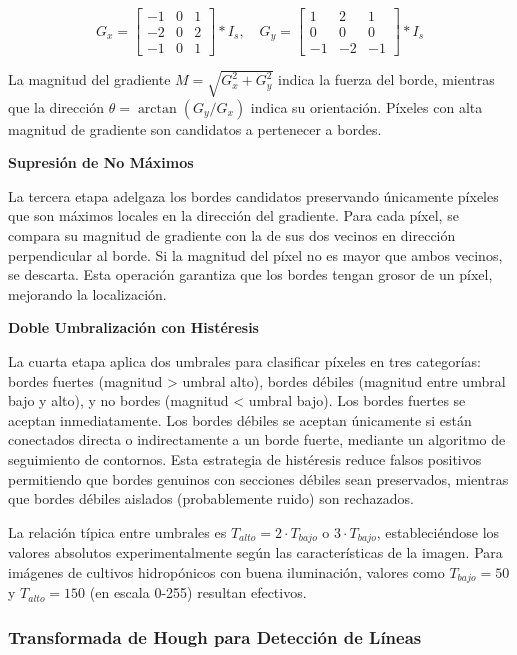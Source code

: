 \begin{equation}
G_x = \begin{bmatrix} -1 & 0 & 1 \\ -2 & 0 & 2 \\ -1 & 0 & 1 \end{bmatrix} \ast I_s, \quad G_y = \begin{bmatrix} 1 & 2 & 1 \\ 0 & 0 & 0 \\ -1 & -2 & -1 \end{bmatrix} \ast I_s
\end{equation}

La magnitud del gradiente $M = \sqrt{G_x^2 + G_y^2}$ indica la fuerza del borde, mientras que la dirección $\theta = \arctan(G_y/G_x)$ indica su orientación. Píxeles con alta magnitud de gradiente son candidatos a pertenecer a bordes.

\textbf{Supresión de No Máximos}

La tercera etapa adelgaza los bordes candidatos preservando únicamente píxeles que son máximos locales en la dirección del gradiente. Para cada píxel, se compara su magnitud de gradiente con la de sus dos vecinos en dirección perpendicular al borde. Si la magnitud del píxel no es mayor que ambos vecinos, se descarta. Esta operación garantiza que los bordes tengan grosor de un píxel, mejorando la localización.

\textbf{Doble Umbralización con Histéresis}

La cuarta etapa aplica dos umbrales para clasificar píxeles en tres categorías: bordes fuertes (magnitud > umbral alto), bordes débiles (magnitud entre umbral bajo y alto), y no bordes (magnitud < umbral bajo). Los bordes fuertes se aceptan inmediatamente. Los bordes débiles se aceptan únicamente si están conectados directa o indirectamente a un borde fuerte, mediante un algoritmo de seguimiento de contornos. Esta estrategia de histéresis reduce falsos positivos permitiendo que bordes genuinos con secciones débiles sean preservados, mientras que bordes débiles aislados (probablemente ruido) son rechazados.

La relación típica entre umbrales es $T_{alto} = 2 \cdot T_{bajo}$ o $3 \cdot T_{bajo}$, estableciéndose los valores absolutos experimentalmente según las características de la imagen. Para imágenes de cultivos hidropónicos con buena iluminación, valores como $T_{bajo} = 50$ y $T_{alto} = 150$ (en escala 0-255) resultan efectivos.

\subsubsection{Transformada de Hough para Detección de Líneas}

